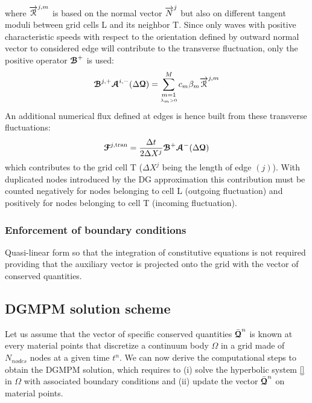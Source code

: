 where ${\overrightarrow{\mathcal{R}}}^{j,m}$ is based on the normal vector ${\overrightarrow{N}}^j$ but also on different tangent moduli between grid cells L and its neighbor T. Since only waves with positive characteristic speeds with respect to the orientation defined by outward normal vector to considered edge will contribute to the transverse fluctuation, only the positive operator ${\boldsymbol{\mathcal{B}}}^+$ is used:
\begin{equation}
{\boldsymbol{\mathcal{B}}}^{j,+} {\boldsymbol{\mathcal{A}}}^{i,-}(\Delta {\boldsymbol{\mathcal{Q}}}) = \sum_{\underset{\lambda_m >0}{m=1}}^{M} c_m \beta_m {\overrightarrow{\mathcal{R}}}^{j,m}
\end{equation}
An additional numerical flux defined at edges is hence built from these transverse fluctuations:
\begin{equation}
{\boldsymbol{\mathcal{F}}}^{j,\text{tran}} = \frac{\Delta t}{2 \Delta X^j} {\boldsymbol{\mathcal{B}}}^+ {\boldsymbol{\mathcal{A}}}^-(\Delta {\boldsymbol{\mathcal{Q}}})
\end{equation}
which contributes to the grid cell T ($\Delta X^j$ being the length of edge $(j)$). With duplicated nodes introduced by the DG approximation this contribution must be counted negatively for nodes belonging to cell L (outgoing fluctuation) and positively for nodes belonging to cell T (incoming fluctuation).
\subsubsection*{Enforcement of boundary conditions}
Quasi-linear form so that the integration of constitutive equations is not required providing that the auxiliary vector is projected onto the grid with the vector of conserved quantities.

\subsection{DGMPM solution scheme}
Let us assume that the vector of specific conserved quantities $\bar{{\boldsymbol{\mathcal{Q}}}}^n$ is known at every material points that discretize a continuum body $\Omega$ in a grid made of $N_{nodes}$ nodes at a given time $t^n$. We can now derive the computational steps to obtain the DGMPM solution, which requires to (i) solve the hyperbolic system \eqref{} in $\Omega$ with associated boundary conditions and (ii) update the vector $\bar{{\boldsymbol{\mathcal{Q}}}}^n$ on material points.

